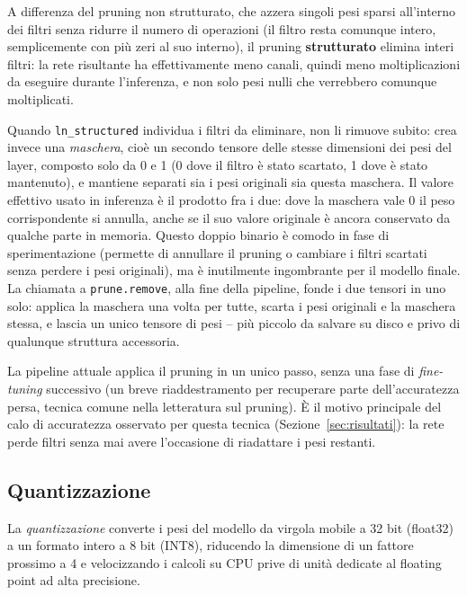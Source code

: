 A differenza del pruning non strutturato, che azzera singoli pesi sparsi
all'interno dei filtri senza ridurre il numero di operazioni (il filtro
resta comunque intero, semplicemente con più zeri al suo interno), il
pruning \textbf{strutturato} elimina interi filtri: la rete risultante ha
effettivamente meno canali, quindi meno moltiplicazioni da eseguire durante
l'inferenza, e non solo pesi nulli che verrebbero comunque moltiplicati.

Quando \texttt{ln\_structured} individua i filtri da eliminare, non li
rimuove subito: crea invece una \emph{maschera}, cioè un secondo tensore
delle stesse dimensioni dei pesi del layer, composto solo da 0 e 1 (0 dove
il filtro è stato scartato, 1 dove è stato mantenuto), e mantiene separati
sia i pesi originali sia questa maschera. Il valore effettivo usato in
inferenza è il prodotto fra i due: dove la maschera vale 0 il peso
corrispondente si annulla, anche se il suo valore originale è ancora
conservato da qualche parte in memoria. Questo doppio binario è comodo in
fase di sperimentazione (permette di annullare il pruning o cambiare i
filtri scartati senza perdere i pesi originali), ma è inutilmente
ingombrante per il modello finale. La chiamata a \texttt{prune.remove},
alla fine della pipeline, fonde i due tensori in uno solo: applica la
maschera una volta per tutte, scarta i pesi originali e la maschera stessa,
e lascia un unico tensore di pesi -- più piccolo da salvare su disco e
privo di qualunque struttura accessoria.

\begin{notebox}
La pipeline attuale applica il pruning in un unico passo, senza una fase di
\emph{fine-tuning} successivo (un breve riaddestramento per recuperare parte
dell'accuratezza persa, tecnica comune nella letteratura sul pruning). È il
motivo principale del calo di accuratezza osservato per questa tecnica
(Sezione~\ref{sec:risultati}): la rete perde filtri senza mai avere
l'occasione di riadattare i pesi restanti.
\end{notebox}

\subsection{Quantizzazione}

La \emph{quantizzazione} converte i pesi del modello da virgola mobile a 32
bit (float32) a un formato intero a 8 bit (INT8), riducendo la dimensione
di un fattore prossimo a 4 e velocizzando i calcoli su CPU prive di unità
dedicate al floating point ad alta precisione.

